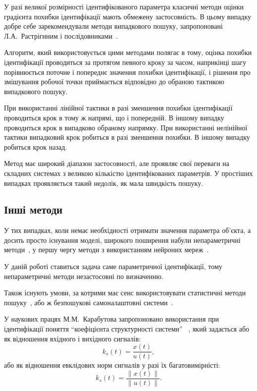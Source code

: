 У разі великої розмірності ідентифікованого параметра класичні
методи оцінки градієнта похибки ідентифікації мають обмежену
застосовність.
В цьому випадку добре себе зарекомендували методи випадкового
пошуку, запропоновані Л.А.~Растрігиним і послідовниками~\cite{rastr_rand_search,rastr_rand_search_adopt,ivanov_stoh_alg_int,gladkov_optim_nongrad}.

Алгоритм, який використовується цими методами полягає в тому,
оцінка похибки ідентифікації проводиться за протягом певного
кроку за часом,
наприкінці шагу
порівнюється поточне і попереднє значення похибки
ідентифікації, і рішення про змішування робочої точки
приймається відповідно до обраною тактикою випадкового пошуку.

При використанні лінійної тактики в разі зменшення похибки
ідентифікації проводиться крок в тому ж напрямі, що і
попередній. В іншому випадку проводиться крок в випадково
обраному напрямку. При використанні нелінійної тактики
випадковий крок робиться в разі зменшення похибки. В іншому
випадку робиться крок назад.

Метод має широкий діапазон застосовності, але проявляє
свої переваги на складних системах з великою кількістю
ідентифікованих параметрів. У простіших випадках проявляється
такий недолік, як мала швидкість пошуку.


\subsection{Інші методи} %

У тих випадках, коли немає необхідності отримати значення
параметра об'єкта, а досить просто існування моделі, широкого
поширення набули непараметричні методи~\cite{medved_nepar_alg_id_nds},
у першу чергу методи з використанням нейроних
мереж~\cite{chen_nn_for_nls_mod,chen_nls_id_radial_basis,patra_nds_id_cheb,narendra_id_ctl_ds_nn,bodyan_adapt_viyavl}.

У даній роботі ставиться задача саме параметричної
ідентифікації, тому  непараметричні методи незастосовні по
визначенню.

Також існують умови, за котрими має сенс використовувати
статистичні методи пошуку~\cite{rastr_stat_meth_search},
або ж
безпошукові самоналаштовні системи~\cite{kozlov_nosearch_sns}.


У наукових працях М.М.~Карабутова
запропоновано використання при ідентифікації
поняття ``коефіцієнта структурності системи''
~\cite{karabutov_adapt_id_sys,saliga_id_ctl_black},
який задається або як відношення
вхідного і вихідного сигналів:
%
\[
  k_s(t) = \frac{x(t)}{u(t)},
\]
%
або як відношення евклідових норм сигналів у разі їх багатовимірністі:
%
\[
  k_s(t) = \frac{\|x(t)\|}{\|u(t)\|}.
\]

